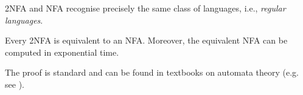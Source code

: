 2NFA and NFA recognise precisely the same class of languages, i.e., 
\emph{regular languages}. 

\begin{proposition}
	Every 2NFA is equivalent to an NFA. Moreover, the equivalent
    NFA can be computed in exponential time.
\end{proposition}

The proof is standard and can be found in textbooks on automata theory
(e.g. see \cite{Kozen-automata}). 




